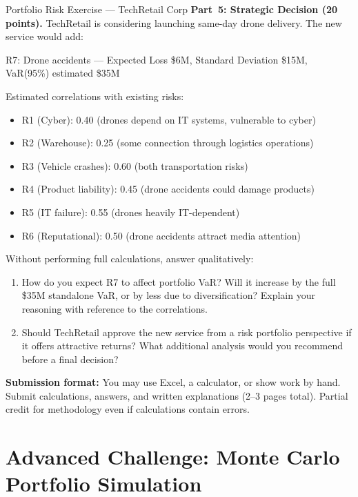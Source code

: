 \documentclass[11pt,openany]{book}
\providecommand{\tightlist}{\setlength{\itemsep}{0pt}\setlength{\parskip}{0pt}}
\begin{document}
\begin{minicase}{Portfolio Risk Exercise --- TechRetail Corp}
\medskip
\textbf{Part~5: Strategic Decision (20 points).} TechRetail is considering
launching same-day drone delivery. The new service would add:

R7: Drone accidents --- Expected Loss \$6M, Standard Deviation \$15M,
VaR(95\%) estimated \$35M

Estimated correlations with existing risks:
\begin{itemize}\tightlist
  \item R1 (Cyber): 0.40 (drones depend on IT systems, vulnerable to cyber)
  \item R2 (Warehouse): 0.25 (some connection through logistics operations)
  \item R3 (Vehicle crashes): 0.60 (both transportation risks)
  \item R4 (Product liability): 0.45 (drone accidents could damage products)
  \item R5 (IT failure): 0.55 (drones heavily IT-dependent)
  \item R6 (Reputational): 0.50 (drone accidents attract media attention)
\end{itemize}

Without performing full calculations, answer qualitatively:
\begin{enumerate}[label=\alph*)]\tightlist
  \item How do you expect R7 to affect portfolio VaR? Will it increase by the
        full \$35M standalone VaR, or by less due to diversification? Explain
        your reasoning with reference to the correlations.
  \item Should TechRetail approve the new service from a risk portfolio
        perspective if it offers attractive returns? What additional analysis
        would you recommend before a final decision?
\end{enumerate}

\medskip
\textbf{Submission format:} You may use Excel, a calculator, or show work by
hand. Submit calculations, answers, and written explanations (2--3 pages
total). Partial credit for methodology even if calculations contain errors.

\end{minicase}

\section*{Advanced Challenge: Monte Carlo Portfolio Simulation}
\end{document}
